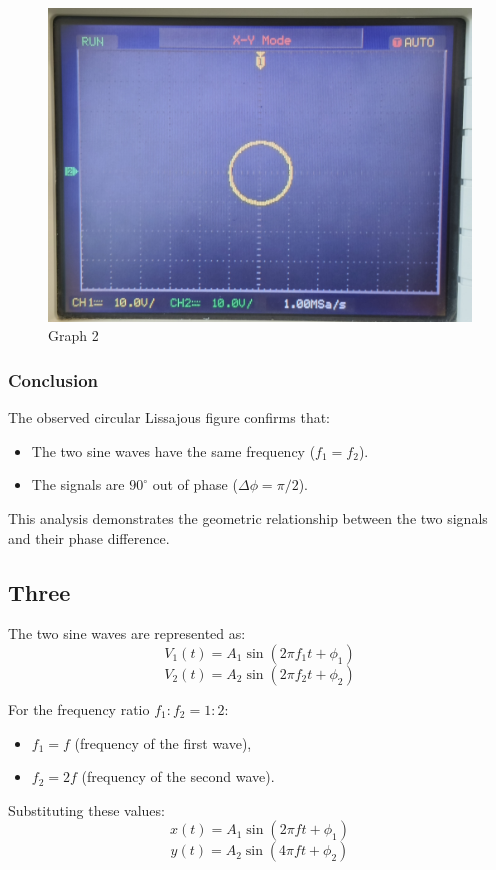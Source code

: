 \documentclass[12pt,a4paper]{report}
\begin{document}
\begin{figure}[H]
\begin{minipage}[c]{0.48\textwidth}
    \end{minipage}
    \hfill
    \begin{minipage}[c]{0.48\textwidth}
        \includegraphics[width=\textwidth]{figs/2cro.jpg} %
        
    \end{minipage}
    \caption{Graph 2}
    \label{fig:CRO-patterns}
\end{figure}
\subsubsection*{Conclusion}
The observed circular Lissajous figure confirms that:
\begin{itemize}
    \item The two sine waves have the same frequency (\(f_1 = f_2\)).
    \item The signals are \(90^\circ\) out of phase (\(\Delta \phi = \pi/2\)).
\end{itemize}
This analysis demonstrates the geometric relationship between the two signals and their phase difference.

\subsection{Three}
The two sine waves are represented as:
\[
V_1(t) = A_1 \sin(2 \pi f_1 t + \phi_1)
\]
\[
V_2(t) = A_2 \sin(2 \pi f_2 t + \phi_2)
\]

For the frequency ratio $f_1 : f_2 = 1 : 2$:
\begin{itemize}
    \item $f_1 = f$ (frequency of the first wave),
    \item $f_2 = 2f$ (frequency of the second wave).
\end{itemize}
Substituting these values:
\[
x(t) = A_1 \sin(2 \pi f t + \phi_1)
\]
\[
y(t) = A_2 \sin(4 \pi f t + \phi_2)
\]
\end{document}
